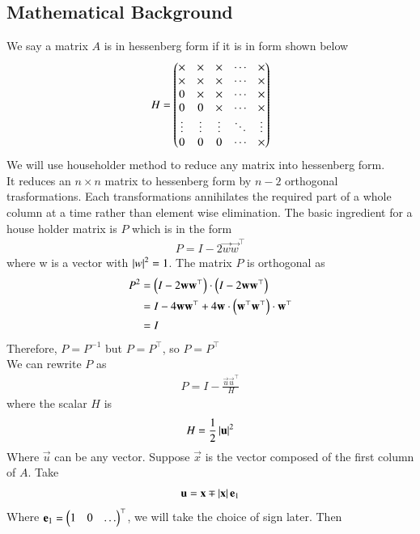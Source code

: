 \documentclass[a4paper,12pt]{article}
\theoremstyle{remark}
\begin{document}
\subsection{Mathematical Background}
We say a matrix $A$ is in hessenberg form if it is in form shown below
\begin{align}
H = 
\begin{pmatrix}
\times & \times & \times & \cdots & \times \\
\times & \times & \times & \cdots & \times \\
0      & \times & \times & \cdots & \times \\
0      & 0      & \times & \cdots & \times \\
\vdots & \vdots & \vdots & \ddots & \vdots \\
0      & 0      & 0      & \cdots & \times
\end{pmatrix}
\end{align}
We will use householder method to reduce any matrix into hessenberg form.\\
It reduces an $n\times n$ matrix to hessenberg form by $n-2$ orthogonal trasformations. Each transformations annihilates the required part of a whole column at a time rather than element wise elimination. The basic ingredient for a house holder matrix is $P$ which is in the form
\begin{align}
	P = I-2\vec{w}\vec{w}^\top
\end{align}
where w is a vector with $\left\vert w\right\vert^2=1$. The matrix $P$ is orthogonal as
\begin{align}
P^2 &=\left(I - 2\mathbf{w}\mathbf{w}^\top\right)\cdot\left(I - 2\mathbf{w}\mathbf{w}^\top\right)\\
    &=I-4\mathbf{w}\mathbf{w}^\top + 4\mathbf{w}\cdot\left(\mathbf{w}^\top\mathbf{w}^\top\right)\cdot\mathbf{w}^\top\\
    &=I
\end{align}
Therefore, $P=P^{-1}$ but $P = P^\top$, so $P = P^\top$ \\
We can rewrite $P$ as
\begin{align}
	P = I - \frac{\vec{u}\vec{u}^\top}{H}
\end{align}
where the scalar $H$ is
\begin{align}
H = \frac{1}{2}\left\vert\mathbf{u}\right\vert^2
\end{align}
Where $\vec{u}$ can be any vector. Suppose $\vec{x}$ is the vector composed of the first column of $A$. Take
\begin{align}
	\mathbf{u} = \mathbf{x} \mp \left\vert\mathbf{x}\right\vert\mathbf{e}_1
\end{align}
Where $\mathbf{e}_1 = \begin{pmatrix}1 & 0 & \dots\end{pmatrix}^\top$, we will take the choice of sign later. Then
\end{document}
